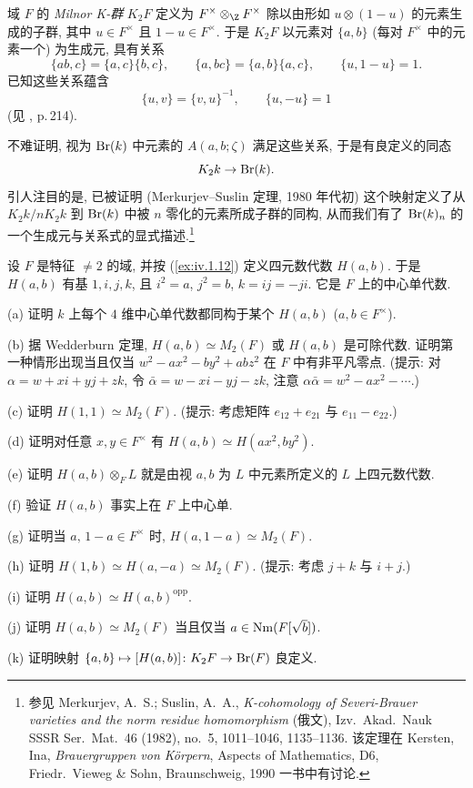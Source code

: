 域 $F$ 的 \emph{Milnor K-群} $K_2F$ 定义为 $F^{\times}\otimes_{\Z}F^{\times}$ 除以由形如 $u\otimes(1-u)$ 的元素生成的子群, 其中 $u\in F^{\times}$ 且 $1-u\in F^{\times}$. 于是 $K_2F$ 以元素对 $\{a,b\}$ (每对 $F^{\times}$ 中的元素一个) 为生成元, 具有关系
\[
\{ab,c\}=\{a,c\}\{b,c\},\qquad
\{a,bc\}=\{a,b\}\{a,c\},\qquad
\{u,1-u\}=1.
\]
已知这些关系蕴含
\[
\{u,v\}=\{v,u\}^{-1},\qquad
\{u,-u\}=1
\]
(见 \cite{Rosenberg1994}, p.\,214).

不难证明, 视为 $\operatorname{Br}(k)$ 中元素的 $A(a,b;\zeta)$ 满足这些关系, 于是有良定义的同态
\[
K_{2}k\to\operatorname{Br}(k).
\]
引人注目的是, 已被证明 (Merkurjev--Suslin 定理, 1980 年代初) 这个映射定义了从 $K_2k/nK_2k$ 到 $\operatorname{Br}(k)$ 中被 $n$ 零化的元素所成子群的同构, 从而我们有了 $\operatorname{Br}(k)_n$ 的一个生成元与关系式的显式描述.\footnote{参见 Merkurjev, A.~S.; Suslin, A.~A., \emph{K-cohomology of Severi-Brauer varieties and the norm residue homomorphism} (俄文), Izv.\ Akad.\ Nauk SSSR Ser.\ Mat.\ 46 (1982), no.~5, 1011--1046, 1135--1136. 该定理在 Kersten, Ina, \emph{Brauergruppen von K\"orpern}, Aspects of Mathematics, D6, Friedr.\ Vieweg \& Sohn, Braunschweig, 1990 一书中有讨论.}

\begin{exercise}\label{ex:iv.5.7}
设 $F$ 是特征 $\neq 2$ 的域, 并按 (\ref{ex:iv.1.12}) 定义四元数代数 $H(a,b)$. 于是 $H(a,b)$ 有基 $1,i,j,k$, 且 $i^2=a$, $j^2=b$, $k=ij=-ji$. 它是 $F$ 上的中心单代数.

(a) 证明 $k$ 上每个 $4$ 维中心单代数都同构于某个 $H(a,b)$ ($a,b\in F^{\times}$).

(b) 据 Wedderburn 定理, $H(a,b)\simeq M_2(F)$ 或 $H(a,b)$ 是可除代数. 证明第一种情形出现当且仅当 $w^2-ax^2-by^2+abz^2$ 在 $F$ 中有非平凡零点. (提示: 对 $\alpha=w+xi+yj+zk$, 令 $\bar{\alpha}=w-xi-yj-zk$, 注意 $\alpha\bar{\alpha}=w^2-ax^2-\cdots$.)

(c) 证明 $H(1,1)\simeq M_2(F)$. (提示: 考虑矩阵 $e_{12}+e_{21}$ 与 $e_{11}-e_{22}$.)

(d) 证明对任意 $x,y\in F^{\times}$ 有 $H(a,b)\simeq H(ax^2,by^2)$.

(e) 证明 $H(a,b)\otimes_F L$ 就是由视 $a,b$ 为 $L$ 中元素所定义的 $L$ 上四元数代数.

(f) 验证 $H(a,b)$ 事实上在 $F$ 上中心单.

(g) 证明当 $a,\,1-a\in F^{\times}$ 时, $H(a,1-a)\simeq M_2(F)$.

(h) 证明 $H(1,b)\simeq H(a,-a)\simeq M_2(F)$. (提示: 考虑 $j+k$ 与 $i+j$.)

(i) 证明 $H(a,b)\simeq H(a,b)^{\mathrm{opp}}$.

(j) 证明 $H(a,b)\simeq M_2(F)$ 当且仅当 $a\in\operatorname{Nm}(F[\sqrt{b}])$.

(k) 证明映射 $\{a,b\}\mapsto[H(a,b)]\colon K_2F\to\operatorname{Br}(F)$ 良定义.
\end{exercise}

